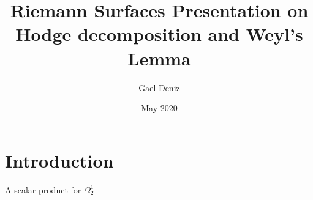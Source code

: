 \documentclass{article}
\title{Riemann Surfaces Presentation on Hodge decomposition and Weyl's Lemma}
\author{Gael Deniz}
\date{May 2020}
\begin{document}
\maketitle

\section{Introduction}

\begin{frame}{A scalar product for $\Omega^1_2$}

\end{frame}
\end{document}
